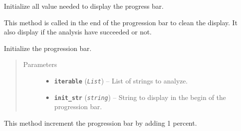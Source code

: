 \documentclass[letterpaper,10pt,oneside]{sphinxmanual}
\begin{document}
\begin{fulllineitems}
\begin{fulllineitems}
\end{fulllineitems}


\begin{fulllineitems}
\label{index:lib.progress_bar.ProgressBar.__init__}
Initialize all value needed to display the progress bar.

\end{fulllineitems}


\begin{fulllineitems}
\label{index:lib.progress_bar.ProgressBar.close}
This method is called in the end of the progression bar to clean the
display. It also display if the analysis have succeeded or not.

\end{fulllineitems}


\begin{fulllineitems}
\label{index:lib.progress_bar.ProgressBar.init}
Initialize the progression bar.
\begin{quote}\begin{description}
\item[{Parameters}] \leavevmode\begin{itemize}
\item {} 
\textbf{\texttt{iterable}} (\emph{\texttt{List}}) -- List of strings to analyze.

\item {} 
\textbf{\texttt{init\_str}} (\emph{\texttt{string}}) -- String to display in the begin of the progression
bar.

\end{itemize}

\end{description}\end{quote}

\end{fulllineitems}


\begin{fulllineitems}
\label{index:lib.progress_bar.ProgressBar.update}
This method increment the progression bar by adding 1 percent.

\end{fulllineitems}


\end{fulllineitems}
\end{document}
